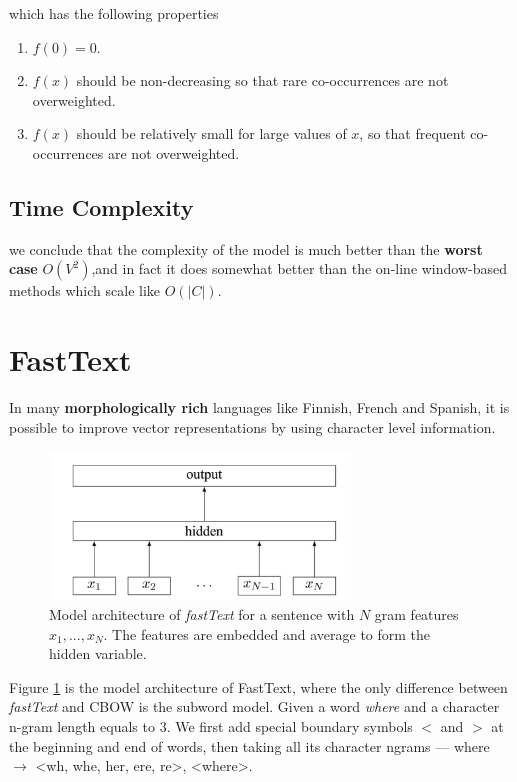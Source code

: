 \documentclass[a3paper, 12pt]{book} %
\begin{document}
which has the following properties
\begin{enumerate}
	\item $f(0)=0$.
	\item $f(x)$ should be non-decreasing so that rare co-occurrences are not overweighted.
	\item $f(x)$ should be relatively small for large values of $x$, so that frequent co-occurrences are
	not overweighted.
\end{enumerate}

\subsection{Time Complexity}

we conclude that the complexity of the model is much better than the \textbf{worst case} $O(V^2)$,and in fact it does somewhat better than the on-line window-based methods which scale like $O(|C|)$.

\section{FastText}
In many \textbf{morphologically rich} languages like Finnish, French and Spanish, \citep{bojanowski2016enriching} it is possible to improve vector representations by using character level information.

\begin{figure}[htpb]
	\centering
	\includegraphics[width=8cm]{figures/fasttext_model_architecture.png}
	\caption{Model architecture of \emph{fastText} for a sentence with $N$ gram features $x_1,...,x_N$. The features are embedded and average to form the hidden variable.}
	\label{fig:fasttext}
\end{figure}

Figure \ref{fig:fasttext} is the model architecture of FastText, where the only difference between \emph{fastText} and CBOW is the subword model. Given a word \emph{where} and a character n-gram length equals to $3$. We first add special boundary symbols $<$ and $>$ at the beginning and end of words, then taking all its character ngrams --- where $\to$ <wh, whe, her, ere, re>, <where>. \\
\end{document}
